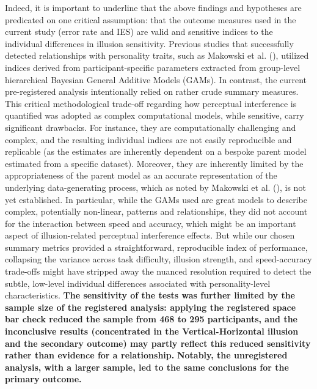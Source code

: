 \documentclass[
  man,
  floatsintext,
  longtable,
  nolmodern,
  notxfonts,
  notimes,
  colorlinks=true,linkcolor=blue,citecolor=blue,urlcolor=blue]{apa7}
\begin{document}
Indeed, it is important to underline that the above findings and
hypotheses are predicated on one critical assumption: that the outcome
measures used in the current study (error rate and IES) are valid and
sensitive indices to the individual differences in illusion sensitivity.
Previous studies that successfully detected relationships with
personality traits, such as Makowski et al.
(), utilized indices derived from
participant-specific parameters extracted from group-level hierarchical
Bayesian General Additive Models (GAMs). In contrast, the current
pre-registered analysis intentionally relied on rather crude summary
measures. This critical methodological trade-off regarding how
perceptual interference is quantified was adopted as complex
computational models, while sensitive, carry significant drawbacks. For
instance, they are computationally challenging and complex, and the
resulting individual indices are not easily reproducible and replicable
(as the estimates are inherently dependent on a bespoke parent model
estimated from a specific dataset). Moreover, they are inherently
limited by the appropriateness of the parent model as an accurate
representation of the underlying data-generating process, which as noted
by Makowski et al. (), is not yet
established. In particular, while the GAMs used are great models to
describe complex, potentially non-linear, patterns and relationships,
they did not account for the interaction between speed and accuracy,
which might be an important aspect of illusion-related perceptual
interference effects. But while our chosen summary metrics provided a
straightforward, reproducible index of performance, collapsing the
variance across task difficulty, illusion strength, and speed-accuracy
trade-offs might have stripped away the nuanced resolution required to
detect the subtle, low-level individual differences associated with
personality-level characteristics. \textbf{The sensitivity of the tests
was further limited by the sample size of the registered analysis:
applying the registered space bar check reduced the sample from 468 to
295 participants, and the inconclusive results (concentrated in the
Vertical-Horizontal illusion and the secondary outcome) may partly
reflect this reduced sensitivity rather than evidence for a
relationship.} \textbf{Notably, the unregistered analysis, with a larger
sample, led to the same conclusions for the primary outcome.}
\end{document}
